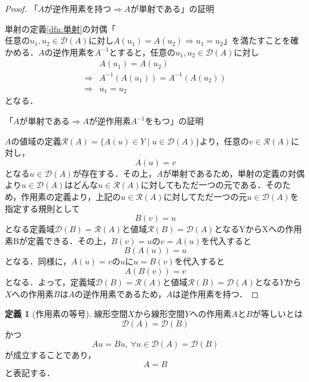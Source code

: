 \documentclass[11pt,a4paper,titlepage]{jsreport}
\theoremstyle{definition}
\newtheorem{dfn}{定義}
\begin{document}
\begin{proof}
  「$Aが逆作用素を持つ \Rightarrow Aが単射である$」の証明

  単射の定義\ref{dfn:単射}の対偶「$任意のu_1,u_2\in\mathcal{D}(A)に対しA(u_1)=A(u_2) \Rightarrow u_1=u_2$」を満たすことを確かめる．$A$の逆作用素を$A^{-1}$とすると，任意の$u_1,u_2\in\mathcal{D}(A)$に対し
  \begin{align*}
                & A(u_1) = A(u_2)               \\
    \Rightarrow & A^{-1}(A(u_1))=A^{-1}(A(u_2)) \\
    \Rightarrow & u_1=u_2
  \end{align*}
  となる．

  $「Aが単射である\Rightarrow Aが逆作用素A^{-1}をもつ」の証明$

  $A$の値域の定義$\mathcal{R}(A)=\{A(u)\in Y \mid u\in\mathcal{D}(A)\}$より，任意の$v\in\mathcal{R}(A)$に対し，
  \begin{equation*}
    A(u)=v
  \end{equation*}
  となる$u\in\mathcal{D}(A)$が存在する．その上，$A$が単射であるため，単射の定義の対偶より$u\in\mathcal{D}(A)$はどんな$u\in\mathcal{R}(A)$に対してもただ一つの元である．そのため，作用素の定義より，上記の$u\in\mathcal{R}(A)$に対してただ一つの元$u\in\mathcal{D}(A)$を指定する規則として
  \begin{equation*}
    B(v)=u
  \end{equation*}
  となる定義域$\mathcal{D}(B)=\mathcal{R}(A)$と値域$\mathcal{R}(B)=\mathcal{D}(A)$となるYからXへの作用素Bが定義できる．その上，$B(v)=u$の$v=A(u)$を代入すると
  \begin{equation*}
    B(A(u))=u
  \end{equation*}
  となる．同様に，$A(u)=v$の$u$に$u=B(v)$を代入すると
  \begin{equation*}
    A(B(v))=v
  \end{equation*}
  となる．よって，定義域$\mathcal{D}(B)=\mathcal{R}(A)$と値域$\mathcal{R}(B)=\mathcal{D}(A)$となる$Y$から$X$への作用素$B$は$A$の逆作用素であるため，$A$は逆作用素を持つ．
\end{proof}

\begin{dfn}[作用素の等号]
  線形空間$X$から線形空間$Y$への作用素$A$と$B$が等しいとは
  \begin{equation*}
    \mathcal{D}(A) = \mathcal{D}(B)
  \end{equation*}
  かつ
  \begin{equation*}
    Au=Bu, \  \forall u\in\mathcal{D}(A)=\mathcal{D}(B)
  \end{equation*}
  が成立することであり，
  \begin{equation*}
    A=B
  \end{equation*}
  と表記する．
\end{dfn}
\end{document}
